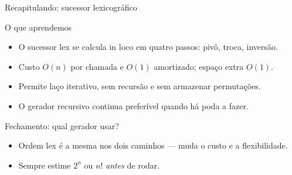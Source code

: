 \documentclass[aspectratio=169]{beamer}
\begin{document}
\begin{frame}{Recapitulando: sucessor lexicográfico}
  \begin{block}{O que aprendemos}
    \begin{itemize}
      \item O sucessor lex se calcula in loco em quatro passos: pivô, troca, inversão.
      \item Custo $O(n)$ por chamada e $O(1)$ amortizado; espaço extra $O(1)$.
      \item Permite laço iterativo, sem recursão e sem armazenar permutações.
      \item O gerador recursivo continua preferível quando há poda a fazer.
    \end{itemize}
  \end{block}
\end{frame}

\begin{frame}{Fechamento: qual gerador usar?}
  \begin{center}
  \end{center}
  \begin{itemize}
    \item Ordem lex é a mesma nos dois caminhos --- muda o custo e a flexibilidade.
    \item Sempre estime $2^n$ ou $n!$ \emph{antes} de rodar.
  \end{itemize}
\end{frame}
\end{document}
